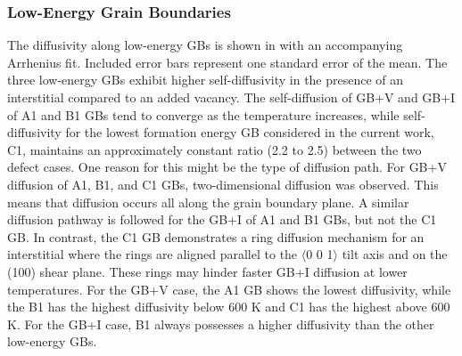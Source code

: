 \documentclass[review]{elsarticle}
\begin{document}
\subsubsection{Low-Energy Grain Boundaries}

\par The diffusivity along low-energy GBs is shown in  with an accompanying Arrhenius fit. Included error bars represent one standard error of the mean. The three low-energy GBs exhibit higher self-diffusivity in the presence of an interstitial compared to an added vacancy. The self-diffusion of GB+V and GB+I of A1 and B1 GBs tend to converge as the temperature increases, while self-diffusivity for the lowest formation energy GB considered in the current work, C1, maintains an approximately constant ratio (2.2 to 2.5) between the two defect cases. One reason for this might be the type of diffusion path. For GB+V diffusion of A1, B1, and C1 GBs, two-dimensional diffusion was observed. This means that diffusion occurs all along the grain boundary plane. A similar diffusion pathway is followed for the GB+I of A1 and B1 GBs, but not the C1 GB. In contrast, the C1 GB demonstrates a ring diffusion mechanism for an interstitial where the rings are aligned parallel to the $\langle$0 0 1$\rangle$ tilt axis and on the (100) shear plane. These rings may hinder faster GB+I diffusion at lower temperatures. For the GB+V case, the A1 GB shows the lowest diffusivity, while the B1 has the highest diffusivity below 600 K and C1 has the highest above 600 K. For the GB+I case, B1 always possesses a higher diffusivity than the other low-energy GBs. 

\end{document}

